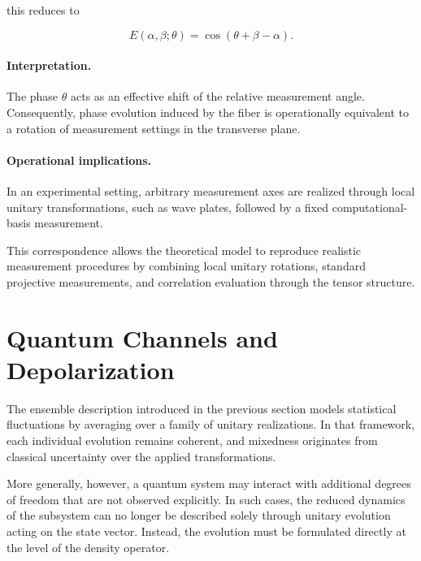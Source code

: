 this reduces to

\begin{equation}
E(\alpha,\beta;\theta)
=
\cos(\theta + \beta - \alpha).
\label{eq:equatorial_axis_correlation}
\end{equation}

\medskip

\paragraph{Interpretation.}

The phase \( \theta \) acts as an effective shift of the relative measurement angle. Consequently, phase evolution induced by the fiber is operationally equivalent to a rotation of measurement settings in the transverse plane.

\medskip

\paragraph{Operational implications.}

In an experimental setting, arbitrary measurement axes are realized through local unitary transformations, such as wave plates, followed by a fixed computational-basis measurement.

This correspondence allows the theoretical model to reproduce realistic measurement procedures by combining local unitary rotations, standard projective measurements, and correlation evaluation through the tensor structure.


\section{Quantum Channels and Depolarization}
\label{sec:quantum_channels_and_depolarization}

The ensemble description introduced in the previous section models statistical fluctuations by averaging over a family of unitary realizations. In that framework, each individual evolution remains coherent, and mixedness originates from classical uncertainty over the applied transformations.

\medskip

More generally, however, a quantum system may interact with additional degrees of freedom that are not observed explicitly. In such cases, the reduced dynamics of the subsystem can no longer be described solely through unitary evolution acting on the state vector. Instead, the evolution must be formulated directly at the level of the density operator.

